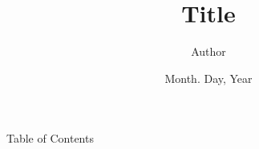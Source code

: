 \documentclass[aspectratio=43, dvipdfmx, 10pt]{beamer}
\title{Title}
\author{Author}
\date{Month. Day, Year}
\begin{document}
\begin{frame}[noframenumbering]
	\thispagestyle{empty}
	\titlepage
\end{frame}

\begin{frame}[noframenumbering]{Table of Contents}
    \tableofcontents
\end{frame}


%     
%     
\end{document}
